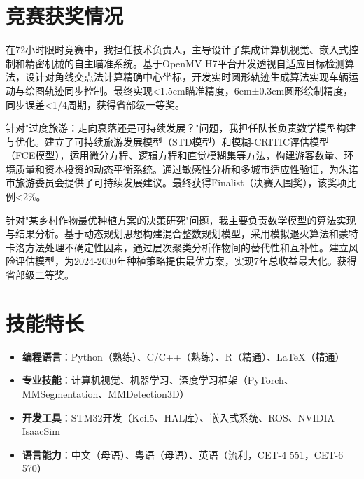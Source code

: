 \documentclass{resume}
\begin{document}
\section{竞赛获奖情况}

在72小时限时竞赛中，我担任技术负责人，主导设计了集成计算机视觉、嵌入式控制和精密机械的自主瞄准系统。基于OpenMV H7平台开发透视自适应目标检测算法，设计对角线交点法计算精确中心坐标，开发实时圆形轨迹生成算法实现车辆运动与绘图轨迹同步控制。最终实现<1.5cm瞄准精度，6cm±0.3cm圆形绘制精度，同步误差<1/4周期，获得省部级一等奖。

针对"过度旅游：走向衰落还是可持续发展？"问题，我担任队长负责数学模型构建与优化。建立了可持续旅游发展模型（STD模型）和模糊-CRITIC评估模型（FCE模型），运用微分方程、逻辑方程和直觉模糊集等方法，构建游客数量、环境质量和资本投资的动态平衡系统。通过敏感性分析和多城市适应性验证，为朱诺市旅游委员会提供了可持续发展建议。最终获得Finalist（决赛入围奖），该奖项比例<2\%。

针对"某乡村作物最优种植方案的决策研究"问题，我主要负责数学模型的算法实现与结果分析。基于动态规划思想构建混合整数规划模型，采用模拟退火算法和蒙特卡洛方法处理不确定性因素，通过层次聚类分析作物间的替代性和互补性。建立风险评估模型，为2024-2030年种植策略提供最优方案，实现7年总收益最大化。获得省部级二等奖。

\section{技能特长}

\begin{itemize}[parsep=0.5ex]
  \item \textbf{编程语言}：Python（熟练）、C/C++（熟练）、R（精通）、LaTeX（精通）
  \item \textbf{专业技能}：计算机视觉、机器学习、深度学习框架（PyTorch、MMSegmentation、MMDetection3D）
  \item \textbf{开发工具}：STM32开发（Keil5、HAL库）、嵌入式系统、ROS、NVIDIA IsaacSim
  \item \textbf{语言能力}：中文（母语）、粤语（母语）、英语（流利，CET-4 551，CET-6 570）
\end{itemize}
\end{document}
